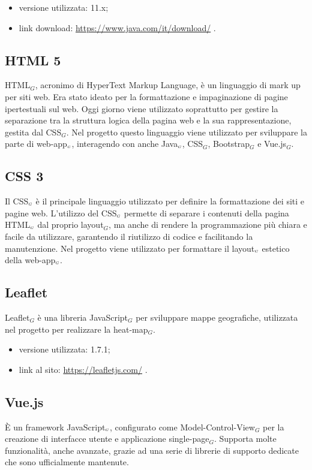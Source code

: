 \begin{itemize}
	\item versione utilizzata: 11.x;
	\item link download: \url{https://www.java.com/it/download/} .
\end{itemize}

\subsection{HTML 5}\label{TecnologieHTML}
HTML$_G$, acronimo di HyperText Markup Language, è un linguaggio di mark up per siti web.
Era stato ideato per la formattazione e impaginazione di pagine ipertestuali sul web.
Oggi giorno viene utilizzato soprattutto per gestire la separazione tra la struttura logica della pagina web e la sua rappresentazione, gestita dal CSS$_G$.
Nel progetto questo linguaggio viene utilizzato per sviluppare la parte di web-app$_{\scaleto{G}{3pt}}$, interagendo con anche Java$_{\scaleto{G}{3pt}}$, CSS$_G$, Bootstrap$_G$ e Vue.js$_G$.


\subsection{CSS 3}\label{TecnologieCSS}
Il CSS$_{\scaleto{G}{3pt}}$ è il principale linguaggio utilizzato per definire la formattazione dei siti e pagine web.
L'utilizzo del CSS$_{\scaleto{G}{3pt}}$ permette di separare i contenuti della pagina HTML$_{\scaleto{G}{3pt}}$ dal proprio layout$_G$, ma anche di rendere la programmazione più chiara e facile da utilizzare, garantendo il riutilizzo di codice e facilitando la manutenzione.
Nel progetto viene utilizzato per formattare il layout$_{\scaleto{G}{3pt}}$ estetico della web-app$_{\scaleto{G}{3pt}}$.

\subsection{Leaflet} \label{TecnologieLeaflet}
Leaflet$_G$ è una libreria JavaScript$_G$ per sviluppare mappe geografiche, utilizzata nel progetto per realizzare la heat-map$_G$.
\begin{itemize}
	\item versione utilizzata: 1.7.1;
	\item link al sito: \url{https://leafletjs.com/} .
\end{itemize}


\subsection{Vue.js}\label{TecnologieVue}
È un framework JavaScript$_{\scaleto{G}{3pt}}$, configurato come Model-Control-View$_G$ per la creazione di interfacce utente e applicazione single-page$_G$.
Supporta molte funzionalità, anche avanzate, grazie ad una serie di librerie di supporto dedicate che sono ufficialmente mantenute.

